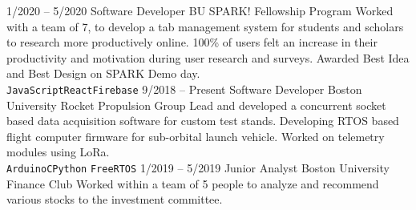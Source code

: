 \documentclass[9pt]{developercv} %
\begin{document}
\begin{entrylist}
	\entry
	{1/2020 -- 5/2020}
	{Software Developer}
	{BU SPARK! Fellowship Program}
	{Worked with a team of 7, to develop a tab management system for students and
		scholars to research more productively online. 100\% of users felt an increase in
		their productivity and motivation during user research and surveys. Awarded Best
		Idea and Best Design on SPARK Demo day.\\
		\texttt{JavaScript}\slashsep\texttt{React}\slashsep\texttt{Firebase}}
	\entry
	{9/2018 -- Present}
	{Software Developer}
	{Boston University Rocket Propulsion Group}
	{Lead and developed a concurrent socket based data acquisition software for custom test stands.
		Developing RTOS based flight computer firmware for sub-orbital launch vehicle. Worked
		on telemetry modules using LoRa. \\\texttt{Arduino}\slashsep\texttt{C}\slashsep\texttt{Python}
		\slashsep\texttt{FreeRTOS}}
	\entry
	{1/2019 -- 5/2019}
	{Junior Analyst}
	{Boston University Finance Club}
	{Worked within a team of 5 people to analyze and recommend various stocks to the investment committee.}

\end{entrylist}
\end{document}
